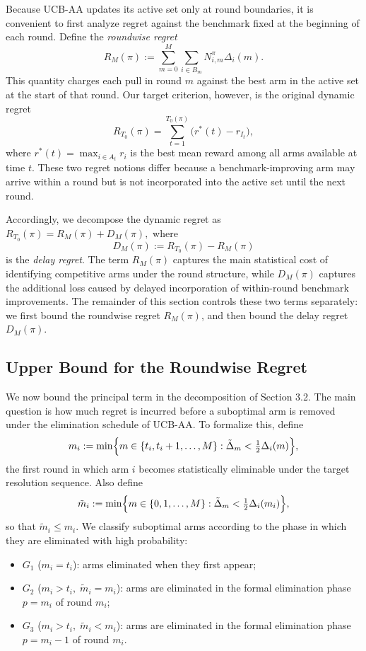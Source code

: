 \documentclass[11pt]{article}
\begin{document}
Because UCB-AA updates its active set only at round boundaries, it is convenient to first
analyze regret against the benchmark fixed at the beginning of each round. Define the
\emph{roundwise regret}
\[
R_M(\pi):=\sum_{m=0}^M \sum_{i\in B_m} N^\pi_{i,m}\Delta_i(m).
\]
This quantity charges each pull in round \(m\) against the best arm in the active set at the
start of that round.
Our target criterion, however, is the original dynamic regret
\[
R_{T_0}(\pi)=\sum_{t=1}^{T_0(\pi)}\bigl(r^*(t)-r_{I_t}\bigr),
\]
where \(r^*(t)=\max_{i\in A_t} r_i\) is the best mean reward among all arms available at
time \(t\). These two regret notions differ because a benchmark-improving arm may arrive
within a round but is not incorporated into the active set until the next round.

Accordingly, we decompose the dynamic regret as
\(
R_{T_0}(\pi)=R_M(\pi)+D_M(\pi),
\)
where
\[
D_M(\pi):=R_{T_0}(\pi)-R_M(\pi)
\]
is the \emph{delay regret}. The term \(R_M(\pi)\) captures the main statistical cost of
identifying competitive arms under the round structure, while \(D_M(\pi)\) captures the
additional loss caused by delayed incorporation of within-round benchmark improvements.
The remainder of this section controls these two terms separately: we first bound the
roundwise regret \(R_M(\pi)\), and then bound the delay regret \(D_M(\pi)\).

\subsection{Upper Bound for the Roundwise Regret}\label{sec: Upper Bound for the Roundwise Regret}

We now bound the principal term in the decomposition of Section 3.2.
The main question is how much regret is incurred before a suboptimal arm is removed under
the elimination schedule of UCB-AA.
To formalize this, define
\[
m_i:=\min\Bigl\{m\in\{t_i,t_i+1,\dots,M\}:\tilde\Delta_m<\tfrac12\Delta_i(m)\Bigr\},
\]
the first round in which arm \(i\) becomes statistically eliminable under the target
resolution sequence. Also define
\[
\tilde m_i:=\min\Bigl\{m\in\{0,1,\dots,M\}:\tilde\Delta_m<\tfrac12\Delta_i(m_i)\Bigr\},
\]
so that \(\tilde m_i\le m_i\).
We classify suboptimal arms according to the phase in which they are eliminated with high
probability:
\begin{itemize}
    \item \(G_1\) ($m_i=t_i$): arms eliminated when they first appear;
    \item \(G_2\) ($m_i>t_i,\;\tilde{m}_i=m_i$): arms are eliminated in the formal elimination phase \(p=m_i\) of round \(m_i\);
    \item \(G_3\) ($m_i>t_i,\;\tilde{m}_i<m_i$): arms are eliminated in the formal elimination phase \(p=m_i-1\) of round \(m_i\).
\end{itemize}
\end{document}
